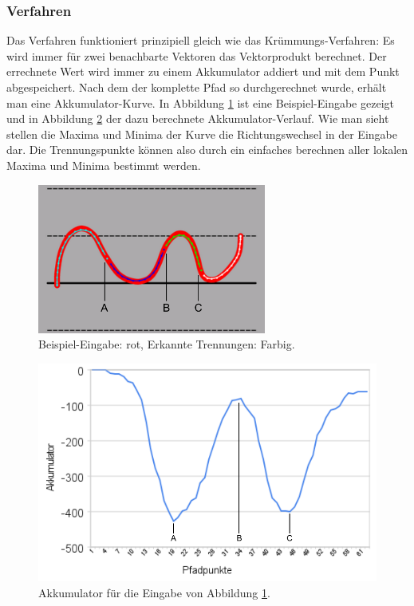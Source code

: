 \subsubsection{Verfahren}
Das Verfahren funktioniert prinzipiell gleich wie das Krümmungs-Verfahren: Es wird immer für zwei benachbarte Vektoren das Vektorprodukt berechnet. Der errechnete Wert wird immer zu einem Akkumulator addiert und mit dem Punkt abgespeichert. Nach dem der komplette Pfad so durchgerechnet wurde, erhält man eine Akkumulator-Kurve. In Abbildung \ref{drehrichtungBeispiel} ist eine Beispiel-Eingabe gezeigt und in Abbildung \ref{akkumulatorDiagramm} der dazu berechnete Akkumulator-Verlauf. Wie man sieht stellen die Maxima und Minima der Kurve die Richtungswechsel in der Eingabe dar. Die Trennungspunkte können also durch ein einfaches berechnen aller lokalen Maxima und Minima bestimmt werden.

\begin{figure}[h!]
  \centering
    \includegraphics[width=0.67\textwidth]{./img/akkumulator_beispiel.pdf}
  \caption{Beispiel-Eingabe: rot, Erkannte Trennungen: Farbig.}
  \label{drehrichtungBeispiel}
\end{figure}

\begin{figure}[h!]
  \centering
    \includegraphics[width=1.0\textwidth]{./img/akkumulator_diagramm.pdf}
  \caption{Akkumulator für die Eingabe von Abbildung \ref{drehrichtungBeispiel}.}
  \label{akkumulatorDiagramm}
\end{figure}

